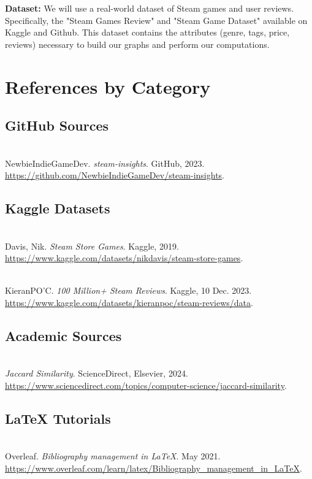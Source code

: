 \documentclass[fontsize=11pt]{article}
\begin{document}
\textbf{Dataset:} We will use a real-world dataset of Steam games and user reviews. Specifically, the "Steam Games Review" and "Steam Game Dataset" available on Kaggle and Github. This dataset contains the attributes (genre, tags, price, reviews) necessary to build our graphs and perform our computations.

\section*{References by Category}

\subsection*{GitHub Sources}

\noindent
[New23] \\
NewbieIndieGameDev. \textit{steam-insights}. GitHub, 2023. \\
\url{https://github.com/NewbieIndieGameDev/steam-insights}.

\subsection*{Kaggle Datasets}

\noindent
[Dav19] \\
Davis, Nik. \textit{Steam Store Games}. Kaggle, 2019. \\
\url{https://www.kaggle.com/datasets/nikdavis/steam-store-games}.

\noindent
[Kie23] \\
KieranPO'C. \textit{100 Million+ Steam Reviews}. Kaggle, 10 Dec. 2023. \\
\url{https://www.kaggle.com/datasets/kieranpoc/steam-reviews/data}.

\subsection*{Academic Sources}

\noindent
[Jac24] \\
\textit{Jaccard Similarity}. ScienceDirect, Elsevier, 2024. \\
\url{https://www.sciencedirect.com/topics/computer-science/jaccard-similarity}.

\subsection*{LaTeX Tutorials}

\noindent
[Ove21] \\
Overleaf. \textit{Bibliography management in LaTeX}. May 2021. \\
\url{https://www.overleaf.com/learn/latex/Bibliography_management_in_LaTeX}.
\end{document}
